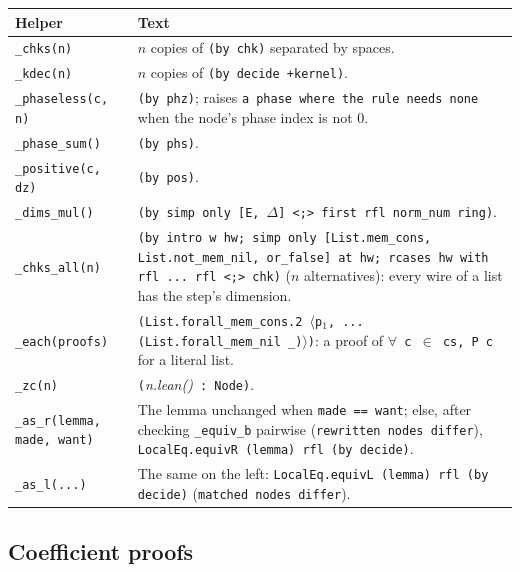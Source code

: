 {\begin{xltabular}{\linewidth}{@{}p{3.5cm}X@{}}
\toprule
Helper & Text \\
\midrule
\texttt{\_\allowbreak{}chks(n)} & $n$ copies of \texttt{(by chk)} separated by spaces. \\
\texttt{\_\allowbreak{}kdec(n)} & $n$ copies of \texttt{(by decide +kernel)}. \\
\texttt{\_\allowbreak{}phaseless(c, n)} & \texttt{(by phz)}; raises \texttt{a phase where the rule needs none} when the
  node's phase index is not 0. \\
\texttt{\_\allowbreak{}phase\_\allowbreak{}sum()} & \texttt{(by phs)}. \\
\texttt{\_\allowbreak{}positive(c, dz)} & \texttt{(by pos)}. \\
\texttt{\_\allowbreak{}dims\_\allowbreak{}mul()} & \texttt{(by simp only [E, $\Delta$] \textless{};\textgreater{} first \textbar{} rfl \textbar{} norm\_\allowbreak{}num \textbar{} ring)}. \\
\texttt{\_\allowbreak{}chks\_\allowbreak{}all(n)} & \texttt{(by intro w hw; simp only [List.mem\_\allowbreak{}cons, List.not\_\allowbreak{}mem\_\allowbreak{}nil, or\_\allowbreak{}false] at hw; rcases hw with rfl \textbar{} ... \textbar{} rfl \textless{};\textgreater{} chk)}
  ($n$ alternatives): every wire of a list has the step's dimension. \\
\texttt{\_\allowbreak{}each(proofs)} & \texttt{(List.forall\_\allowbreak{}mem\_\allowbreak{}cons.2 $\langle$p$_1$, ... (List.forall\_\allowbreak{}mem\_\allowbreak{}nil \_\allowbreak{})$\rangle$)}: a proof
  of \texttt{$\forall$ c $\in$ cs, P c} for a literal list. \\
\texttt{\_\allowbreak{}zc(n)} & \texttt{(}\textit{n.lean()}\texttt{ : Node)}. \\
\texttt{\_\allowbreak{}as\_\allowbreak{}r(lemma, made, want)} & The lemma unchanged when \texttt{made == want}; else, after checking
  \texttt{\_\allowbreak{}equiv\_\allowbreak{}b} pairwise (\texttt{rewritten nodes differ}),
  \texttt{LocalEq.equivR (lemma) rfl (by decide)}. \\
\texttt{\_\allowbreak{}as\_\allowbreak{}l(...)} & The same on the left: \texttt{LocalEq.equivL (lemma) rfl (by decide)}
  (\texttt{matched nodes differ}). \\
\bottomrule
\end{xltabular}

\subsection{Coefficient proofs}\label{sec:lean-export-net-coef}

}
